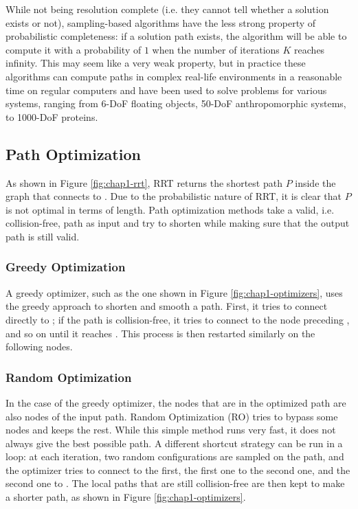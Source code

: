 While not being resolution complete (i.e. they cannot tell whether a
solution exists or not), sampling-based algorithms have the less
strong property of probabilistic completeness: if a solution path
exists, the algorithm will be able to compute it with a probability of
$1$ when the number of iterations $K$ reaches infinity. This may seem
like a very weak property, but in practice these algorithms can
compute paths in complex real-life environments in a reasonable time
on regular computers and have been used to solve problems for various
systems, ranging from 6-DoF floating objects, 50-DoF anthropomorphic
systems, to 1000-DoF proteins.

\subsection{Path Optimization}
\label{subsec:chap1-path-optimization}

As shown in Figure \ref{fig:chap1-rrt}, RRT returns the shortest path
$P$ inside the graph that connects  to . Due to
the probabilistic nature of RRT, it is clear that $P$ is not optimal
in terms of length. Path optimization methods take a valid,
i.e. collision-free, path as input and try to shorten while making
sure that the output path is still valid.

\subsubsection{Greedy Optimization}

A greedy optimizer, such as the one shown in Figure
\ref{fig:chap1-optimizers}, uses the greedy approach to shorten and
smooth a path. First, it tries to connect directly  to
; if the path is collision-free, it tries to connect
 to the node preceding , and so on until it
reaches . This process is then restarted similarly on the
following nodes.

\subsubsection{Random Optimization}

In the case of the greedy optimizer, the nodes that are in the
optimized path are also nodes of the input path. Random Optimization
(RO) tries to bypass some nodes and keeps the rest. While this simple
method runs very fast, it does not always give the best possible
path. A different shortcut strategy can be run in a loop: at each
iteration, two random configurations are sampled on the path, and the
optimizer tries to connect  to the first, the first one to
the second one, and the second one to . The local paths that
are still collision-free are then kept to make a shorter path, as
shown in Figure \ref{fig:chap1-optimizers}.

